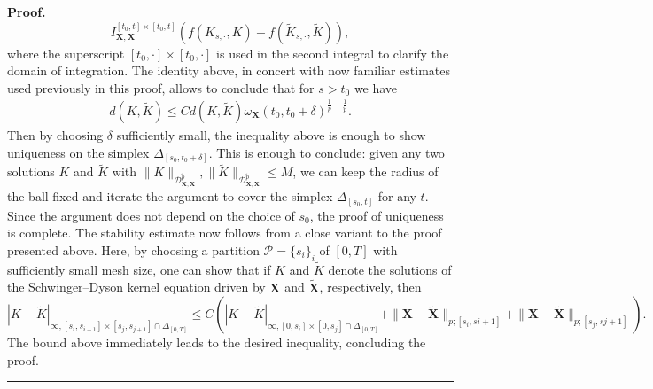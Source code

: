 \documentclass{article}%
\newenvironment{proof}[1][Proof]{\noindent\textbf{#1.} }{\ \rule{0.5em}{0.5em}}
\begin{document}
\begin{proof}
\[ I^{{[t_0, t] \times [t_0, t]}}_{\mathbf{X}, \mathbf X}(f(K_{s, \cdot},K) - f(\tilde{K}_{s, \cdot},\tilde{K})), 
\]
where the superscript ${[t_0, \cdot] \times [t_0, \cdot ]}$ is used in the second integral to clarify the domain of integration.
The identity above, in concert with now familiar estimates used previously in this proof, allows to conclude that for $s > t_0$ we have
\begin{align*}
    d(K, \tilde{K}) \leq C
    d(K, \tilde{K})  \omega_{\mathbf{X}}(t_0, t_0 + \delta)^{\frac{1}{p} - \frac{1}{\tilde{p}}}.
\end{align*}
Then by choosing $\delta$ sufficiently small, the inequality above is enough to show uniqueness on the simplex $\Delta_{[s_0, t_0 + \delta]}$. 
\newline
This is enough to conclude: given any two  solutions $K$ and $\tilde{K}$ with $\|K\|_{\mathcal{D}^{\tilde p}_{\mathbf{X}, \mathbf{X}}}, \|\tilde{K}\|_{\mathcal{D}^ {\tilde p}_{\mathbf{X}, \mathbf{X}}} \le M$, we can keep the radius of the ball fixed and iterate the argument to cover the simplex $\Delta_{[s_0, t]}$ for any $t$. Since the argument does not depend on the choice of $s_0$, the proof of uniqueness is complete. The stability estimate now follows from a close variant to the proof presented above. Here, by choosing a partition \(\mathcal P=\{s_i\}_i\) of \([0,T]\) with sufficiently small mesh size, one can show that if \(K\) and \(\tilde K\) denote the solutions of the Schwinger--Dyson kernel equation driven by \(\mathbf X\) and \(\tilde{\mathbf X}\), respectively, then
\[
|K - \tilde{K}|_{\infty, [s_i, s_{i+1}] \times [s_j, s_{j+1}] \cap \Delta_{[0, T]}} \leq C \left( |K - \tilde{K}|_{\infty, [0, s_i] \times [0, s_j] \cap \Delta_{[0, T]}} + \|\mathbf{X} - \tilde{\mathbf{X}}\|_{p; [s_i, s{i+1}]} + \|\mathbf{X} - \tilde{\mathbf{X}}\|_{p; [s_j, s{j+1}]} \right).
\]
The bound above immediately leads to the desired inequality, concluding the proof.
\end{proof}
\end{document}
